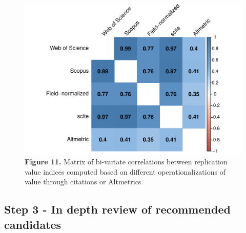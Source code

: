 \documentclass[
  man,floatsintext]{apa6}
\begin{document}
\begin{figure}
\centering
\includegraphics{RVcn_feasibility_in_social_neuroscience_cortex_files/figure-latex/fig11-1.pdf}
\caption{\label{fig:fig11}\textbf{Figure 11.} Matrix of bi-variate correlations between replication value indices computed based on different operationalizations of value through citations or Altmetrics.}
\end{figure}

\hypertarget{step-3---in-depth-review-of-recommended-candidates}{%
\subsection{Step 3 - In depth review of recommended candidates}\label{step-3---in-depth-review-of-recommended-candidates}}
\end{document}
